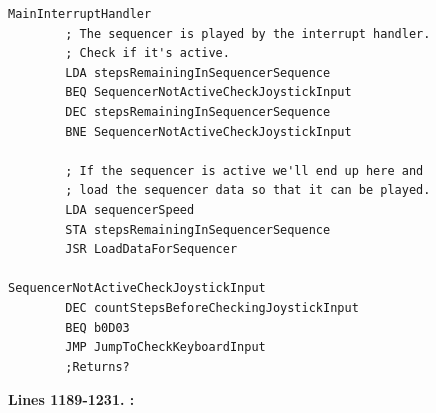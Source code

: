 \begin{lstlisting}[basicstyle=\ttfamily\scriptsize]
MainInterruptHandler
        ; The sequencer is played by the interrupt handler.
        ; Check if it's active.
        LDA stepsRemainingInSequencerSequence
        BEQ SequencerNotActiveCheckJoystickInput
        DEC stepsRemainingInSequencerSequence
        BNE SequencerNotActiveCheckJoystickInput

        ; If the sequencer is active we'll end up here and
        ; load the sequencer data so that it can be played.
        LDA sequencerSpeed
        STA stepsRemainingInSequencerSequence
        JSR LoadDataForSequencer

SequencerNotActiveCheckJoystickInput   
        DEC countStepsBeforeCheckingJoystickInput
        BEQ b0D03
        JMP JumpToCheckKeyboardInput
        ;Returns?
\end{lstlisting}
\clearpage

\textbf{Lines 1189-1231. :} 
\clearpage
